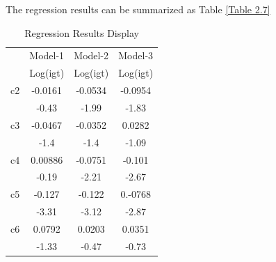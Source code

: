 The regression results can be summarized as Table \ref*{Table 2.7}
\begin{table}[H]
  \centering
  \caption{Regression Results Display}
  \begin{tabular}{cccc}
    \toprule
                                    & \multicolumn{1}{p{7.645em}}{Model-1}  & \multicolumn{1}{p{7.5em}}{Model-2}  & \multicolumn{1}{p{8.07em}}{Model-3}  \\
                                    & \multicolumn{1}{p{7.645em}}{Log(igt)} & \multicolumn{1}{p{7.5em}}{Log(igt)} & \multicolumn{1}{p{8.07em}}{Log(igt)} \\
    \midrule
    \multicolumn{1}{p{6.93em}}{c2}  & -0.0161                               & -0.0534                             & -0.0954                              \\
                                    & -0.43                                 & -1.99                               & -1.83                                \\
    \multicolumn{1}{p{6.93em}}{c3}  & -0.0467                               & -0.0352                             & 0.0282                               \\
                                    & -1.4                                  & -1.4                                & -1.09                                \\
    \multicolumn{1}{p{6.93em}}{c4}  & 0.00886                               & -0.0751                             & -0.101                               \\
                                    & -0.19                                 & -2.21                               & -2.67                                \\
    \multicolumn{1}{p{6.93em}}{c5}  & -0.127                                & -0.122                              & 0.-0768                              \\
                                    & -3.31                                 & -3.12                               & -2.87                                \\
    \multicolumn{1}{p{6.93em}}{c6}  & 0.0792                                & 0.0203                              & 0.0351                               \\
                                    & -1.33                                 & -0.47                               & -0.73                                \\

\end{tabular}
\end{table}
